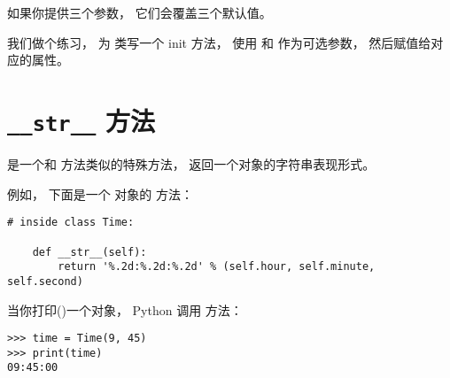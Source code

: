 %

如果你提供三个参数， 它们会覆盖三个默认值。


我们做个练习， 为  类写一个 init 方法， 使用  和  作为可选参数， 然后赋值给对应的属性。
  


\section{ {\tt \_\_str\_\_} 方法}

  


 是一个和 
方法类似的特殊方法， 返回一个对象的字符串表现形式。



例如， 下面是一个  对象的  方法：

\begin{lstlisting}
# inside class Time:

    def __str__(self):
        return '%.2d:%.2d:%.2d' % (self.hour, self.minute, self.second)
\end{lstlisting}

%

当你打印()一个对象， Python 调用  方法：

  

\begin{lstlisting}
>>> time = Time(9, 45)
>>> print(time)
09:45:00
\end{lstlisting}

%

